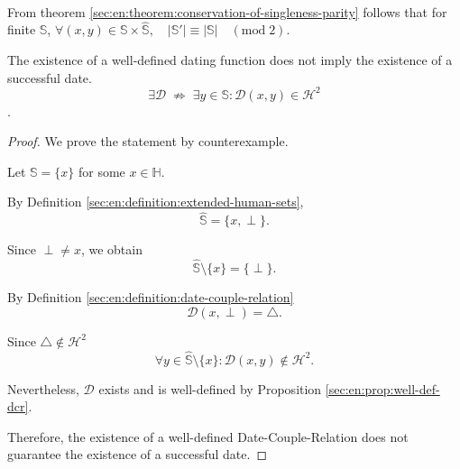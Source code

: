 \begin{corollary}
    \leavevmode\\
    From theorem \ref{sec:en:theorem:conservation-of-singleness-parity} follows that for finite $\mathbb{S}$,
    $\forall(x,y)\in\mathbb{S}\times\hat{\mathbb{S}},\quad |\mathbb{S}'|\equiv|\mathbb{S}| \quad (\mathrm{mod}\;2).$
\end{corollary}

\begin{corollary}
    The existence of a well-defined dating function does not imply the existence of a successful date.
    $$\exists\mathcal D
        \;\not\Rightarrow\;
        \exists y\in\mathbb S:
        \mathcal D(x,y)\in\mathcal H^2$$.

    \begin{proof}
        We prove the statement by counterexample.

        Let $\mathbb S=\{x\}$ for some $x\in\mathbb H$.

        By Definition \ref{sec:en:definition:extended-human-sets},
        \[
            \hat{\mathbb S}=\{x,\perp\}.
        \]

        Since $\perp\neq x$, we obtain
        \[
            \hat{\mathbb S}\setminus\{x\}
            =\{\perp\}.
        \]

        By Definition \ref{sec:en:definition:date-couple-relation}
        \[
            \mathcal D(x,\perp)=\triangle.
        \]

        Since $\triangle\notin\mathcal H^2$
        \[
            \forall y\in
            \hat{\mathbb S}\setminus\{x\}:
            \mathcal D(x,y)\notin\mathcal H^2.
        \]

        Nevertheless, $\mathcal D$ exists and is
        well-defined by Proposition \ref{sec:en:prop:well-def-dcr}.

        Therefore, the existence of a well-defined
        Date-Couple-Relation does not guarantee
        the existence of a successful date.
    \end{proof}
\end{corollary}

